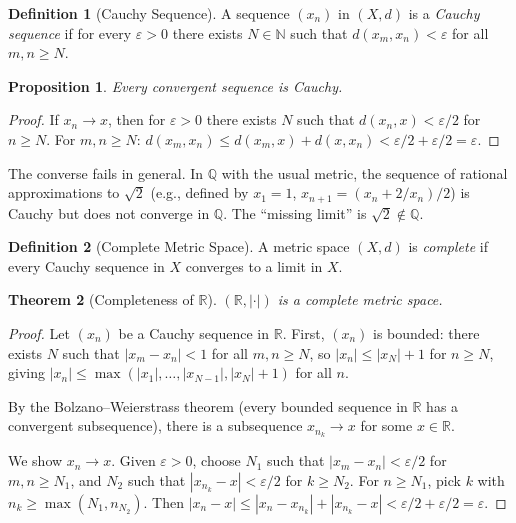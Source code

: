 \documentclass[11pt,a4paper]{article}
\theoremstyle{definition}
\newtheorem{definition}{Definition}[section]
\theoremstyle{plain}
\newtheorem{theorem}{Theorem}[section]
\newtheorem{proposition}[theorem]{Proposition}
\theoremstyle{remark}
\newcommand{\R}{\mathbb{R}}
\newcommand{\N}{\mathbb{N}}
\newcommand{\Q}{\mathbb{Q}}
\begin{document}
\begin{definition}[Cauchy Sequence]
\label{def:cauchy}
A sequence $(x_n)$ in $(X,d)$ is a \emph{Cauchy sequence} if for every
$\varepsilon > 0$ there exists $N \in \N$ such that $d(x_m, x_n) < \varepsilon$
for all $m, n \ge N$.
\end{definition}

\begin{proposition}
\label{prop:convergent_is_cauchy}
Every convergent sequence is Cauchy.
\end{proposition}

\begin{proof}
If $x_n \to x$, then for $\varepsilon > 0$ there exists $N$ such that
$d(x_n, x) < \varepsilon/2$ for $n \ge N$. For $m, n \ge N$:
$d(x_m, x_n) \le d(x_m, x) + d(x, x_n) < \varepsilon/2 + \varepsilon/2 = \varepsilon$.
\end{proof}

\begin{warning}
The converse fails in general. In $\Q$ with the usual metric, the sequence of
rational approximations to $\sqrt{2}$ (e.g., defined by $x_1 = 1$,
$x_{n+1} = (x_n + 2/x_n)/2$) is Cauchy but does not converge in $\Q$.
The ``missing limit'' is $\sqrt{2} \notin \Q$.
\end{warning}

\begin{definition}[Complete Metric Space]
\label{def:complete}
A metric space $(X,d)$ is \emph{complete} if every Cauchy sequence in $X$
converges to a limit in $X$.
\end{definition}

\begin{theorem}[Completeness of $\R$]
\label{thm:R_complete}
$(\R, |\cdot|)$ is a complete metric space.
\end{theorem}

\begin{proof}
Let $(x_n)$ be a Cauchy sequence in $\R$. First, $(x_n)$ is bounded: there exists
$N$ such that $|x_m - x_n| < 1$ for all $m, n \ge N$, so
$|x_n| \le |x_N| + 1$ for $n \ge N$, giving
$|x_n| \le \max(|x_1|, \ldots, |x_{N-1}|, |x_N| + 1)$ for all $n$.

By the Bolzano--Weierstrass theorem (every bounded sequence in $\R$ has a
convergent subsequence), there is a subsequence $x_{n_k} \to x$ for some $x \in \R$.

We show $x_n \to x$. Given $\varepsilon > 0$, choose $N_1$ such that
$|x_m - x_n| < \varepsilon/2$ for $m, n \ge N_1$, and $N_2$ such that
$|x_{n_k} - x| < \varepsilon/2$ for $k \ge N_2$. For $n \ge N_1$, pick $k$ with
$n_k \ge \max(N_1, n_{N_2})$. Then
$|x_n - x| \le |x_n - x_{n_k}| + |x_{n_k} - x| < \varepsilon/2 + \varepsilon/2 = \varepsilon$.
\end{proof}
\end{document}
